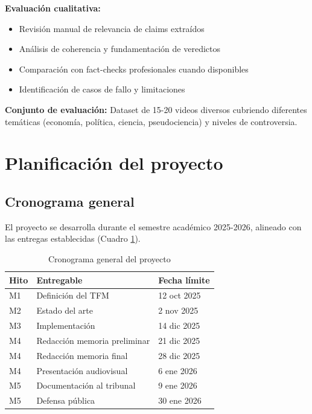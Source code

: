 \documentclass[12pt,a4paper]{article}
\begin{document}
\textbf{Evaluación cualitativa:}
\begin{itemize}
    \item Revisión manual de relevancia de claims extraídos
    \item Análisis de coherencia y fundamentación de veredictos
    \item Comparación con fact-checks profesionales cuando disponibles
    \item Identificación de casos de fallo y limitaciones
\end{itemize}

\textbf{Conjunto de evaluación:} Dataset de 15-20 videos diversos cubriendo diferentes temáticas (economía, política, ciencia, pseudociencia) y niveles de controversia.

\section{Planificación del proyecto}

\subsection{Cronograma general}

El proyecto se desarrolla durante el semestre académico 2025-2026, alineado con las entregas establecidas (Cuadro \ref{tab:cronograma}).

\begin{table}[h]
\centering
\begin{tabular}{|l|l|l|}
\hline
\textbf{Hito} & \textbf{Entregable} & \textbf{Fecha límite} \\
\hline
M1 & Definición del TFM & 12 oct 2025 \\
M2 & Estado del arte & 2 nov 2025\\
M3 & Implementación & 14 dic 2025\\
M4 & Redacción memoria preliminar & 21 dic 2025\\
M4 & Redacción memoria final & 28 dic 2025\\
M4 & Presentación audiovisual & 6 ene 2026\\
M5 & Documentación al tribunal & 9 ene 2026\\
M5 & Defensa pública & 30 ene 2026\\
\hline
\end{tabular}
\caption{Cronograma general del proyecto}
\label{tab:cronograma}
\end{table}
\end{document}
